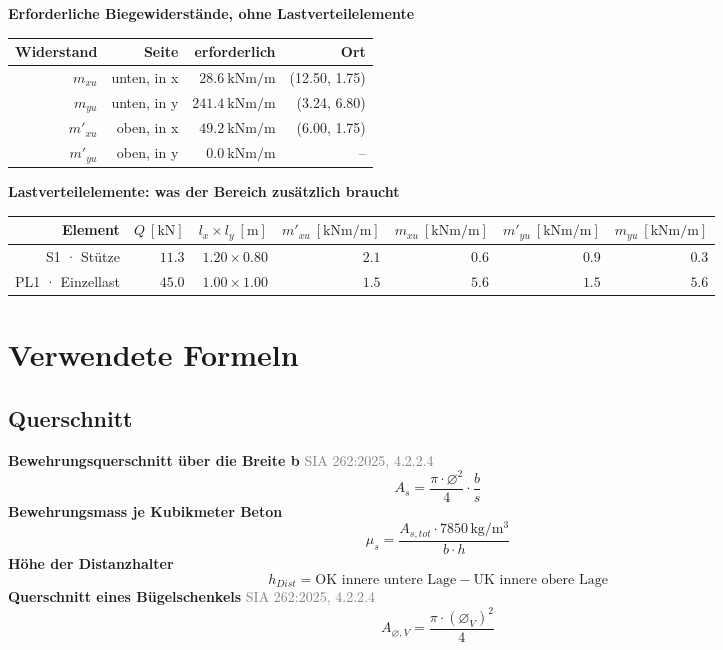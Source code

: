 \documentclass[11pt,a4paper]{article}
\newcommand{\normref}[1]{{\small\textcolor{gray}{#1}}}
\begin{document}
\noindent\textbf{Erforderliche Biegewiderstände, ohne Lastverteilelemente}
\begin{longtable}{rrrr}
\hline
Widerstand & Seite & erforderlich & Ort \\
\hline
\endhead
$m_{xu}$ & unten, in x & $28.6\ \mathrm{kNm/m}$ & (12.50, 1.75) \\
$m_{yu}$ & unten, in y & $241.4\ \mathrm{kNm/m}$ & (3.24, 6.80) \\
$m'_{xu}$ & oben, in x & $49.2\ \mathrm{kNm/m}$ & (6.00, 1.75) \\
$m'_{yu}$ & oben, in y & $0.0\ \mathrm{kNm/m}$ & – \\
\hline
\end{longtable}
\noindent\textbf{Lastverteilelemente: was der Bereich zusätzlich braucht}
\begin{longtable}{rrrrrrr}
\hline
Element & $Q\ [\mathrm{kN}]$ & $l_x \times l_y\ [\mathrm{m}]$ & $m'_{xu}\ [\mathrm{kNm/m}]$ & $m_{xu}\ [\mathrm{kNm/m}]$ & $m'_{yu}\ [\mathrm{kNm/m}]$ & $m_{yu}\ [\mathrm{kNm/m}]$ \\
\hline
\endhead
S1 · Stütze & $11.3$ & $1.20 \times 0.80$ & $2.1$ & $0.6$ & $0.9$ & $0.3$ \\
PL1 · Einzellast & $45.0$ & $1.00 \times 1.00$ & $1.5$ & $5.6$ & $1.5$ & $5.6$ \\
\hline
\end{longtable}
\section{Verwendete Formeln}
\subsection{Querschnitt}
\noindent\textbf{Bewehrungsquerschnitt über die Breite b} \hfill \normref{SIA 262:2025, 4.2.2.4}
\begin{equation*}
A_s = \frac{\pi \cdot \varnothing^{2}}{4} \cdot \frac{b}{s}
\end{equation*}
\noindent\textbf{Bewehrungsmass je Kubikmeter Beton}
\begin{equation*}
\mu_s = \frac{A_{s,tot} \cdot 7850\,\mathrm{kg}/\mathrm{m}^{3}}{b \cdot h}
\end{equation*}
\noindent\textbf{Höhe der Distanzhalter}
\begin{equation*}
h_{Dist} = \text{OK innere untere Lage} - \text{UK innere obere Lage}
\end{equation*}
\noindent\textbf{Querschnitt eines Bügelschenkels} \hfill \normref{SIA 262:2025, 4.2.2.4}
\begin{equation*}
A_{\varnothing,V} = \frac{\pi \cdot \left(\varnothing_{V}\right)^{2}}{4}
\end{equation*}
\end{document}
